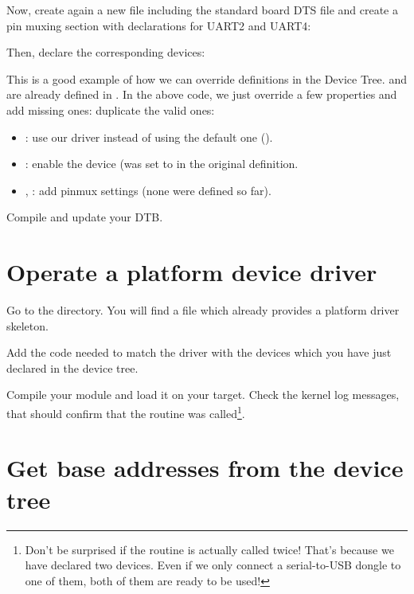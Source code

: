 Now, create again a new
 file including
the standard board DTS file and create a pin muxing section with
declarations for UART2 and UART4:

{\small {}}

Then, declare the corresponding devices:


This is a good example of how we can override definitions in the Device
Tree.  and  are already defined in
. In the above code, we just
override a few properties and add missing ones:
duplicate the valid ones:

\begin{itemize}
\item {}: use our driver instead of using the default one
      ().
\item {}: enable the device (was set to  in
      the original definition.
\item {}, : add pinmux settings
      (none were defined so far).
\end{itemize}

Compile and update your DTB.

\section{Operate a platform device driver}

Go to the  directory.
You will find a  file which already provides a platform
driver skeleton.

Add the code needed to match the driver with the devices which you have
just declared in the device tree.

Compile your module and load it on your target. Check the kernel log
messages, that should confirm that the  routine was
called\footnote{Don't be surprised if the  routine is
actually called twice! That's because we have declared two devices.
Even if we only connect a serial-to-USB dongle to one of them, both
of them are ready to be used!}.

\section{Get base addresses from the device tree}

